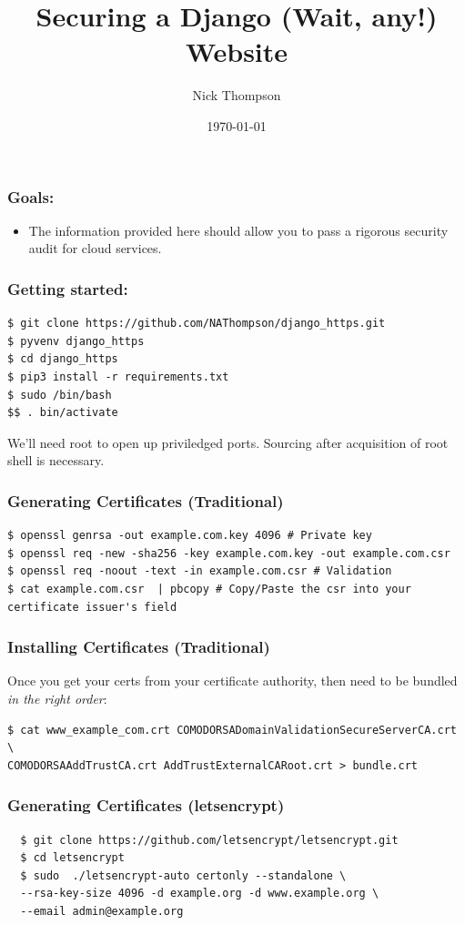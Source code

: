 \documentclass[9pt]{beamer}
\begin{document}
\title{Securing a Django (Wait, any!) Website}
\author{Nick Thompson} 
\date{\today}

\frame{\titlepage}

\begin{frame}[fragile]
\frametitle{Goals:}

\begin{itemize}
\item The information provided here should allow you to pass a rigorous security audit for cloud services.
\end{itemize}
\end{frame}


\begin{frame}[fragile]
\frametitle{Getting started:}
\begin{verbatim}
$ git clone https://github.com/NAThompson/django_https.git
$ pyvenv django_https
$ cd django_https
$ pip3 install -r requirements.txt
$ sudo /bin/bash
$$ . bin/activate
\end{verbatim}
\pause
We'll need root to open up priviledged ports. Sourcing after acquisition of root shell is necessary.
\end{frame}


\begin{frame}[fragile]
\frametitle{Generating Certificates (Traditional)}
\begin{verbatim}
$ openssl genrsa -out example.com.key 4096 # Private key
$ openssl req -new -sha256 -key example.com.key -out example.com.csr
$ openssl req -noout -text -in example.com.csr # Validation
$ cat example.com.csr  | pbcopy # Copy/Paste the csr into your certificate issuer's field
\end{verbatim}
\end{frame}

\begin{frame}[fragile]
\frametitle{Installing Certificates (Traditional)}
Once you get your certs from your certificate authority, then need to be bundled \emph{in the right order}:
\begin{verbatim}
$ cat www_example_com.crt COMODORSADomainValidationSecureServerCA.crt \
COMODORSAAddTrustCA.crt AddTrustExternalCARoot.crt > bundle.crt
\end{verbatim}
\end{frame}

\begin{frame}[fragile]
  \frametitle{Generating Certificates (letsencrypt)}
\begin{verbatim}
  $ git clone https://github.com/letsencrypt/letsencrypt.git
  $ cd letsencrypt
  $ sudo  ./letsencrypt-auto certonly --standalone \
  --rsa-key-size 4096 -d example.org -d www.example.org \
  --email admin@example.org
\end{verbatim}
\end{frame}
\end{document}
